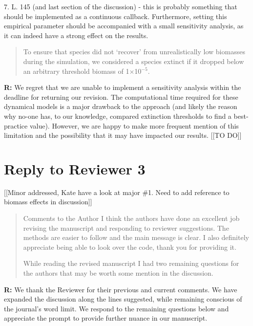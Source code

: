 \documentclass[12pt]{article}
\begin{document}
    \smallskip

    7. L. 145 (and last section of the discussion) - this is probably something that should be implemented as a continuous callback. Furthermore, setting this empirical parameter should be accompanied with a small sensitivity analysis, as it can indeed have a strong effect on the results.

    \smallskip

    \begin{quotation}
    To ensure that species did not ‘recover’ from unrealistically low biomasses during the simulation, we considered a species extinct if it dropped below an arbitrary threshold biomass of 1$\times$10$^{-5}$.
    \end{quotation}

    \textbf{R:} We regret that we are unable to implement a sensitivity analysis within the deadline for returning our revision. The computational time required for these dynamical models is a major drawback to the approach (and likely the reason why no-one has, to our knowledge, compared extinction thresholds to find a best-practice value). However, we are happy to make more frequent mention of this limitation and the possibility that it may have impacted our results. [[TO DO]]

\clearpage


\section*{Reply to Reviewer 3} [[Minor addressed, Kate have a look at major \#1. Need to add reference to biomass effects in discussion]]

  \begin{quotation}
    Comments to the Author
    I think the authors have done an excellent job revising the manuscript and responding to reviewer suggestions. The methods are easier to follow and the main message is clear. I also definitely appreciate being able to look over the code, thank you for providing it.   

    While reading the revised manuscript I had two remaining questions for the authors that may be worth some mention in the discussion. 

  \end{quotation}

  \smallskip

  \textbf{R:} We thank the Reviewer for their previous and current comments. We have expanded the discussion along the lines suggested, while remaining conscious of the journal's word limit. We respond to the remaining questions below and appreciate the prompt to provide further nuance in our manuscript.
\end{document}
